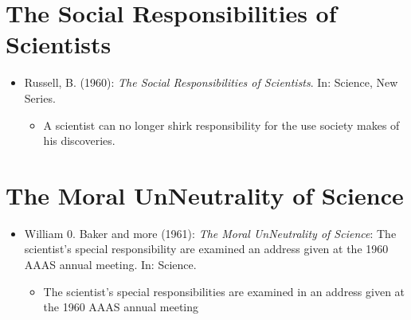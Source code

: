 \section{The Social Responsibilities of Scientists}

\begin{itemize}
	\item Russell, B. (1960): \textit{The Social Responsibilities of Scientists}. In: Science, New Series.
		\begin{itemize}
			\item A scientist can no longer shirk responsibility for the use society makes of his discoveries.
		\end{itemize}
\end{itemize}


\section{The Moral UnNeutrality of Science}

\begin{itemize}
	\item William 0. Baker and more (1961): \textit{The Moral UnNeutrality of Science}: The scientist's special responsibility are examined an address given at the 1960 AAAS annual meeting. In: Science.
		\begin{itemize}
			\item The scientist's special responsibilities are examined in an address given at the 1960 AAAS annual meeting
		\end{itemize}
\end{itemize}


\newpage